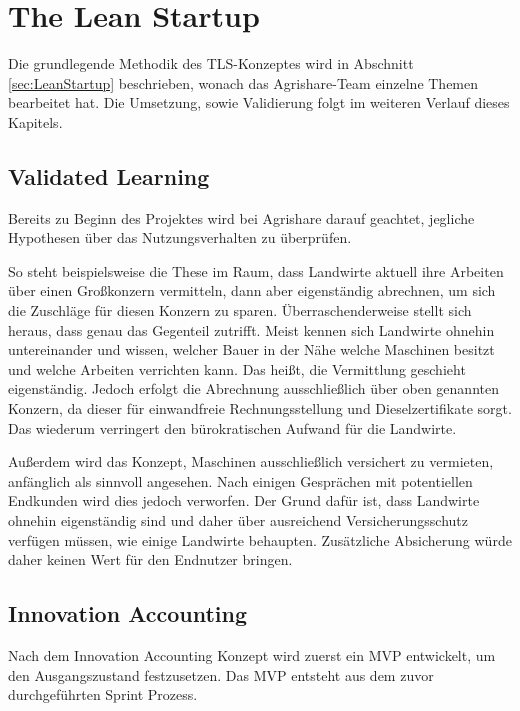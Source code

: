 \section{The Lean Startup}
Die grundlegende Methodik des \ac{TLS}-Konzeptes wird in Abschnitt \ref{sec:LeanStartup} beschrieben, wonach das Agrishare-Team einzelne Themen bearbeitet hat. Die Umsetzung, sowie Validierung folgt im weiteren Verlauf dieses Kapitels.
\subsection*{\label{sec:LeanStartup-Umsetzung-ValidatedLearning}\thesubsection\quad Validated Learning}
Bereits zu Beginn des Projektes wird bei Agrishare darauf geachtet, jegliche Hypothesen über das Nutzungsverhalten zu überprüfen. 

So steht beispielsweise die These im Raum, dass Landwirte aktuell ihre Arbeiten über einen Großkonzern vermitteln, dann aber eigenständig abrechnen, um sich die Zuschläge für diesen Konzern zu sparen. Überraschenderweise stellt sich heraus, dass genau das Gegenteil zutrifft. Meist kennen sich Landwirte ohnehin untereinander und wissen, welcher Bauer in der Nähe welche Maschinen besitzt und welche Arbeiten verrichten kann. Das heißt, die Vermittlung geschieht eigenständig. Jedoch erfolgt die Abrechnung ausschließlich über oben genannten Konzern, da dieser für einwandfreie Rechnungsstellung und Dieselzertifikate sorgt. Das wiederum verringert den bürokratischen Aufwand für die Landwirte.

Außerdem wird das Konzept, Maschinen ausschließlich versichert zu vermieten, anfänglich als sinnvoll angesehen. Nach einigen Gesprächen mit potentiellen Endkunden wird dies jedoch verworfen. Der Grund dafür ist, dass Landwirte ohnehin eigenständig sind und daher über ausreichend Versicherungsschutz verfügen müssen, wie einige Landwirte behaupten. Zusätzliche Absicherung würde daher keinen Wert für den Endnutzer bringen.

\subsection*{\label{sec:LeanStartup-Umsetzung-InnovationAccounting}\thesubsection\quad Innovation Accounting}
Nach dem Innovation Accounting Konzept wird zuerst ein MVP entwickelt, um den Ausgangszustand festzusetzen. Das \ac{MVP} entsteht aus dem zuvor durchgeführten Sprint Prozess.

